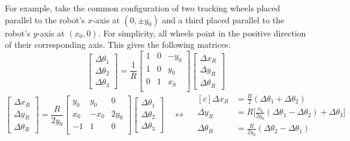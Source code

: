 \documentclass{article}
\begin{document}
For example, take the common configuration of two tracking wheels placed parallel to the robot's $x$-axis at $(0,\pm y_0)$ and a third placed parallel to the robot's $y$-axis at $(x_0,0)$. For simplicity, all wheels point in the positive direction of their corresponding axis. This gives the following matrices:
\begin{equation*}
    \begin{bmatrix}
        \Delta \theta_1\\
        \Delta \theta_2\\
        \Delta \theta_3
    \end{bmatrix}
    =
    \frac{1}{R}
    \begin{bmatrix}
        1 & 0 & -y_0 \\
        1 & 0 & y_0 \\
        0 & 1 & x_0 \\
    \end{bmatrix}
    \begin{bmatrix}
        \Delta x_R\\
        \Delta y_R\\
        \Delta \theta_R
    \end{bmatrix}
\end{equation*}
\begin{equation*}
    \begin{bmatrix}
        \Delta x_R\\
        \Delta y_R\\
        \Delta \theta_R
    \end{bmatrix}
    =
    \frac{R}{2y_0}
    \begin{bmatrix}
        y_0 & y_0 & 0\\
        x_0 & -x_0 & 2y_0\\
        -1 & 1 & 0\\
    \end{bmatrix}
    \begin{bmatrix}
        \Delta \theta_1\\
        \Delta \theta_2\\
        \Delta \theta_3
    \end{bmatrix}
    \quad\leftrightarrow\quad
    \begin{aligned}[c]
        \Delta x_R &= \frac{R}{2}(\Delta \theta_1 + \Delta \theta_2)\\
        \Delta y_R &= R\bigg[\frac{x_0}{2y_0}(\Delta \theta_1 - \Delta \theta_2) + \Delta \theta_3\bigg]\\
        \Delta \theta_R &= \frac{R}{2y_0}(\Delta \theta_2 - \Delta \theta_1)
    \end{aligned}
\end{equation*}
\end{document}
